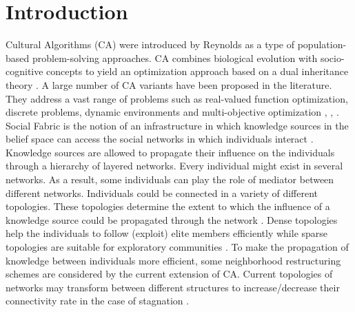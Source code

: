 \documentclass{llncs}
\begin{document}
\section{Introduction}
Cultural Algorithms (CA) were introduced by Reynolds as a type of population-based problem-solving approaches. CA combines biological evolution with socio-cognitive concepts to yield an optimization approach based on a dual inheritance theory \cite{reynolds1994introduction} \cite{kennedy2001swarm}. A large number of CA variants have been proposed in the literature. They address a vast range of problems such as real-valued function optimization, discrete problems, dynamic environments and multi-objective optimization \cite{RaeesiN.2014}, \cite{reynolds2008computing}, \cite{che2010robust}. \newline 
Social Fabric is the notion of an infrastructure in which knowledge sources in the belief space can access the social networks in which individuals interact \cite{reynolds2008social}. Knowledge sources are allowed to propagate their influence on the individuals through a hierarchy of layered networks. Every individual might exist in several networks. As a result, some individuals can play the role of mediator between different networks. \newline
Individuals could be connected in a variety of different topologies. These topologies determine the extent to which the influence of a knowledge source could be propagated through the network \cite{ali2011boosting}. Dense topologies help the individuals to follow (exploit) elite members efficiently while sparse topologies are suitable for exploratory communities \cite{mendes2004population}. To make the propagation of knowledge between individuals more efficient, some neighborhood restructuring schemes are considered by the current extension of CA. Current topologies of networks may transform between different structures to increase/decrease their connectivity rate in the case of stagnation \cite{ali2016leveraged}. \newline
\end{document}
